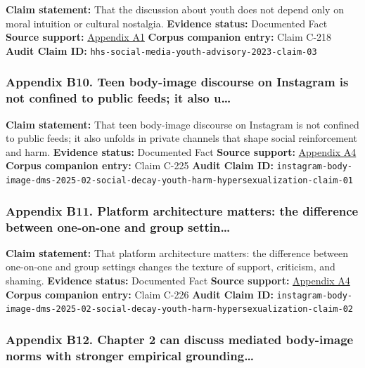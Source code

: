 \documentclass[
  american,
  11pt,
  letterpaper,
]{article}
\begin{document}
\textbf{Claim statement:} That the discussion about youth does not
depend only on moral intuition or cultural nostalgia. \textbf{Evidence
status:} Documented Fact \textbf{Source support:}
\hyperref[ch-02-appendix-a1-social-media-and-youth-mental-health-the-u-s-surgeon-general-s-advisory]{Appendix
A1} \textbf{Corpus companion entry:} Claim C-218 \textbf{Audit Claim
ID:} \texttt{hhs-social-media-youth-advisory-2023-claim-03}

\subsubsection{Appendix B10. Teen body-image discourse on Instagram is
not confined to public feeds; it also
u\ldots{}}\label{ch-02-appendix-b10-teen-body-image-discourse-on-instagram-is-not-confined-to-public-feeds-it-also-u}

\textbf{Claim statement:} That teen body-image discourse on Instagram is
not confined to public feeds; it also unfolds in private channels that
shape social reinforcement and harm. \textbf{Evidence status:}
Documented Fact \textbf{Source support:}
\hyperref[ch-02-appendix-a4-unfiltered-how-teens-engage-in-body-image-and-shaming-discussions-via-instagram-direct-messages-dms]{Appendix
A4} \textbf{Corpus companion entry:} Claim C-225 \textbf{Audit Claim
ID:}
\texttt{instagram-body-image-dms-2025-02-social-decay-youth-harm-hypersexualization-claim-01}

\subsubsection{Appendix B11. Platform architecture matters: the
difference between one-on-one and group
settin\ldots{}}\label{ch-02-appendix-b11-platform-architecture-matters-the-difference-between-one-on-one-and-group-settin}

\textbf{Claim statement:} That platform architecture matters: the
difference between one-on-one and group settings changes the texture of
support, criticism, and shaming. \textbf{Evidence status:} Documented
Fact \textbf{Source support:}
\hyperref[ch-02-appendix-a4-unfiltered-how-teens-engage-in-body-image-and-shaming-discussions-via-instagram-direct-messages-dms]{Appendix
A4} \textbf{Corpus companion entry:} Claim C-226 \textbf{Audit Claim
ID:}
\texttt{instagram-body-image-dms-2025-02-social-decay-youth-harm-hypersexualization-claim-02}

\subsubsection{Appendix B12. Chapter 2 can discuss mediated body-image
norms with stronger empirical
grounding\ldots{}}\label{ch-02-appendix-b12-chapter-2-can-discuss-mediated-body-image-norms-with-stronger-empirical-grounding}
\end{document}
